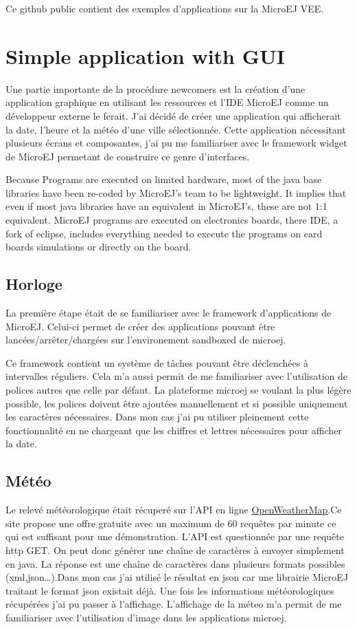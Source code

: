 \documentclass[french,a4paper,12pt]{report}
\begin{document}
Ce github public contient des exemples d’applications sur la MicroEJ VEE.

\section{Simple application with GUI}

Une partie importante de la procédure newcomers est la création d'une application graphique en utilisant les ressources et l'IDE MicroEJ comme un développeur externe le ferait. 
J'ai décidé de créer une application qui afficherait la date, l'heure et la météo d'une ville sélectionnée. Cette application nécessitant plusieurs écrans et composantes, j'ai pu me familiariser avec le framework widget de MicroEJ permetant de construire ce genre d'interfaces.

Because Programs are executed on limited hardware, most of the java base libraries have been re-coded by MicroEJ’s team to be lightweight. It implies that even if most java libraries have an equivalent in MicroEJ’s, these are not 1:1 equivalent. 
MicroEJ programs are executed on electronics boards, there IDE, a fork of eclipse, includes everything needed to execute the programs on card boards simulations or directly on the board.

\subsection{Horloge}

La première étape était de se familiariser avec le framework d’applications de MicroEJ. Celui-ci permet de créer des applications pouvant être lancées/arrêter/chargées sur l’environement sandboxed de microej. 

Ce framework contient un système de tâches pouvant être déclenchées à intervalles réguliers.
Cela m’a aussi permit de me familiariser avec l’utilisation de polices autres que celle par défaut. La plateforme microej se voulant la plus légère possible, les polices doivent être ajoutées manuellement et si possible uniquement les caractères nécessaires. Dans mon cas j’ai pu utiliser pleinement cette fonctionnalité en ne chargeant que les chiffres et lettres nécessaires pour afficher la date. 

\subsection{Météo}

Le relevé météorologique était récuperé sur l’API en ligne \href{https://openweathermap.org/}{OpenWeatherMap}.Ce site propose une offre gratuite avec un maximum de 60 requêtes par minute ce qui est suffisant pour une démonstration. L’API est questionnée par une requête http GET. On peut donc générer une chaîne de caractères à envoyer simplement en java. La réponse est une chaîne de caractères dans plusieurs formats possibles (xml,json…).Dans mon cas j’ai utilisé le résultat en json car une librairie MicroEJ traitant le format json existait déjà. 
Une fois les informations météorologiques récupérées j’ai pu passer à l’affichage. L’affichage de la méteo m’a permit de me familiariser avec l’utilisation d’image dans les applications microej. 
\end{document}
